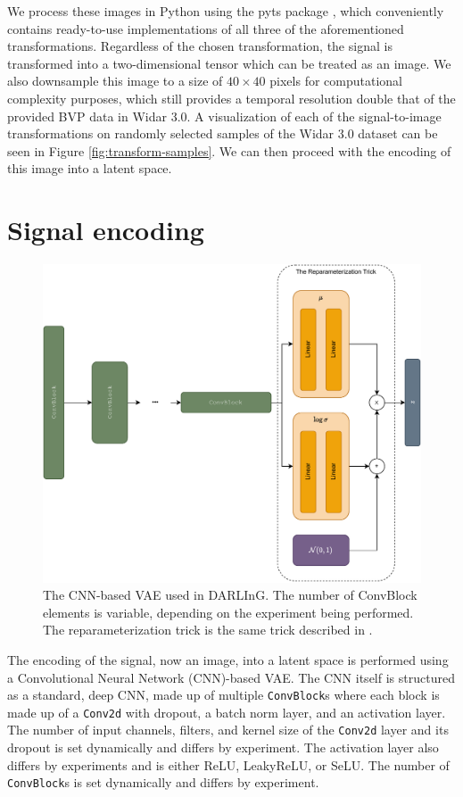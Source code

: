 We process these images in Python using the pyts package \cite{faouzi2020pyts}, which conveniently contains ready-to-use implementations of all three of the aforementioned transformations.
Regardless of the chosen transformation, the signal is transformed into a two-dimensional tensor which can be treated as an image.
We also downsample this image to a size of $40 \times 40$ pixels for computational complexity purposes, which still provides a temporal resolution double that of the provided BVP data in Widar 3.0.
A visualization of each of the signal-to-image transformations on randomly selected samples of the Widar 3.0 dataset can be seen in Figure \ref{fig:transform-samples}.
We can then proceed with the encoding of this image into a latent space.

\section{Signal encoding}\label{sec:methodology-signal-encoding}

\begin{figure}
	\centering
	\includegraphics[width=\textwidth]{figures/vae-diagram}
	\caption{The CNN-based VAE used in DARLInG. The number of ConvBlock elements is variable, depending on the experiment being performed. The reparameterization trick is the same trick described in \cite{kingma2013auto}.}\label{fig:vae-diagram}
\end{figure}

The encoding of the signal, now an image, into a latent space is performed using a Convolutional Neural Network (CNN)-based VAE.
The CNN itself is structured as a standard, deep CNN, made up of multiple \verb|ConvBlock|s where each block is made up of a \verb|Conv2d| with dropout, a batch norm layer, and an activation layer.
The number of input channels, filters, and kernel size of the \verb|Conv2d| layer and its dropout is set dynamically and differs by experiment.
The activation layer also differs by experiments and is either ReLU, LeakyReLU, or SeLU.
The number of \verb|ConvBlock|s is set dynamically and differs by experiment.

